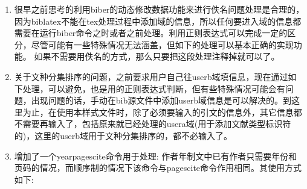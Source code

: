 \label{up:20161114}
\begin{enumerate}
\item 很早之前思考的利用biber的动态修改数据功能来进行佚名问题处理是合理的，因为biblatex不能在tex处理过程中添加域的信息，所以任何要进入域的信息都需要在运行biber命令之时或者之前处理。利用正则表达式可以完成一定的区分，尽管可能有一些特殊情况无法涵盖，但如下的处理可以基本正确的实现功能。
如果不需要用佚名的方式，那么只要把这段处理注释掉就可以了。

\begin{texlist}
\map{%
    \step[fieldset=author, fieldvalue={佚名}]
    }
\map[overwrite]{%
    \step[fieldsource=title,match=\regexp{[a-zA-Z]},final]
    \step[fieldsource=author,match=\regexp{佚名}, replace={NOAUTHOR}]
    }
\end{texlist}

\item 关于文种分集排序的问题，之前要求用户自己往userb域填信息，现在通过如下处理，可以避免，也是用的正则表达式判断，但有些特殊情况可能会有问题，出现问题的话，手动在bib源文件中添加userb域信息是可以解决的。到这里为止，在使用本样式文件时，除了必须要输入的引文的信息外，其它信息都不需要再输入了，包括原来就已经处理的usera域(用于添加文献类型标识符的)，这里的userb域用于文种分集排序的，都不必输入了。

\begin{texlist}
\map{%
     \step[fieldsource=entrykey]
     \step[fieldset=keywords, origfieldval]
     \step[fieldsource=note,final]%
     \step[fieldset=keywords, fieldvalue={,},append]
     \step[fieldset=keywords, origfieldval,append]
     }
\map{%
     \step[fieldsource=author,match=\regexp{[^a-zA-Z\s\.\,\'\{\}]},final]
     \step[fieldset=userb,fieldvalue={cn}]
     }
\map{%
     \step[fieldset=userb,fieldvalue={en}]
     }
\end{texlist}

\item 增加了一个yearpagescite命令用于处理: 作者年制文中已有作者只需要年份和页码的情况，而顺序制的情况下该命令与pagescite命令作用相同。其使用方式如下:


\end{enumerate}
